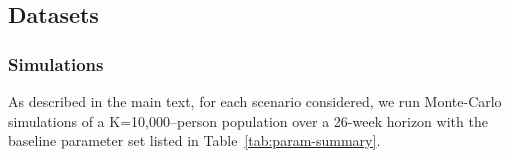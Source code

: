 \documentclass[sigconf,review]{acmart}
\begin{document}
\subsection{Datasets}
\label{data}
\subsubsection{Simulations}
As described in the main text, for each scenario considered, we run Monte-Carlo simulations of a K=10{,}000–person population over a 26-week horizon with the baseline parameter set listed in Table~\ref{tab:param-summary}.


\end{document}
